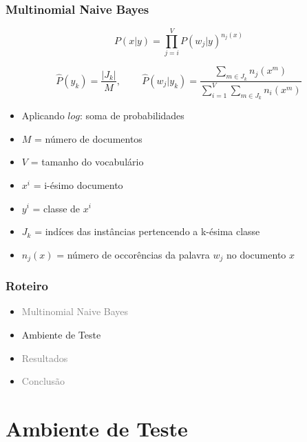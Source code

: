 \documentclass[10pt]{beamer}
\begin{document}
\begin{frame}[fragile]
  \frametitle{Multinomial Naive Bayes}

  \begin{equation} \nonumber
    P(x|y) = \prod_{j=i}^{V} P(w_j|y)^{n_j(x)} 
    \end{equation}

    \begin{equation} \nonumber
    \hat{P}(y_k) = \frac{|J_k|}{M} \mbox{, } \qquad \hat{P}(w_j | y_k) = \frac{\sum_{m \in J_k} n_j(x^m)}{\sum_{i=1}^{V}\sum_{m \in J_k} n_i(x^m)}
    \end{equation}

 \begin{itemize}
      \item Aplicando $log$: soma de probabilidades
      \item $M$ = número de documentos
      \item $V$ = tamanho do vocabulário
      \item $x^i$ = i-ésimo documento
      \item $y^i$ = classe de $x^i$
      \item $J_k$ = indíces das instâncias pertencendo a k-ésima classe
      \item $n_j(x)$ = número de occorências da palavra $w_j$ no documento $x$
   \end{itemize}

\end{frame}


\begin{frame}
  \frametitle{Roteiro}

  \begin{itemize}

    \item[\color{gray}{$\bullet$}] \textcolor{gray}{Multinomial Naive Bayes}

    \item Ambiente de Teste

    \item[\color{gray}{$\bullet$}] \textcolor{gray}{Resultados}

    \item[\color{gray}{$\bullet$}] \textcolor{gray}{Conclusão}

  \end{itemize}

\end{frame}



\section{Ambiente de Teste}
\end{document}
